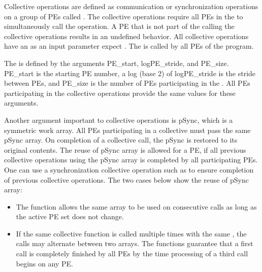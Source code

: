
Collective operations are defined as communication or synchronization operations 
on a group of \ac{PE}s called \activeset{}. The collective operations require all
\ac{PE}s in the \activeset{} to simultaneously call the operation. 
A \ac{PE} that is not part of the \activeset{} calling the collective 
operations results in an undefined behavior. All
collective operations have an \activeset{} as an input parameter expect %
\barrierall{}. The \barrierall{} is called by all \ac{PE}s of the \openshmem{}
program. 

The \activeset{} is defined by the arguments PE\_start, logPE\_stride, 
and PE\_size. PE\_start is the starting \ac{PE} number, a log (base 2) of logPE\_stride 
is the stride between \ac{PE}s, and PE\_size is the number of \ac{PE}s 
participating in the \activeset{}. All \ac{PE}s participating in the 
collective operations provide the same values for these arguments. 
 
Another argument important to collective operations is pSync, which is a symmetric work 
array. All \ac{PE}s participating in a collective must pass the same
pSync array. On completion of a collective call, the pSync is restored to its 
original contents. The reuse of pSync array is allowed for a \ac{PE}, if all previous collective 
operations using the pSync array is completed by all participating 
\ac{PE}s. One can use a synchronization collective operation such as \barrier{}
to ensure completion of previous collective operations. The two cases below
show the reuse of pSync array:

\begin{itemize}
\item The  function allows the same  array to be used
          on consecutive calls as long as the active \ac{PE} set does not change.
\item  If the same collective function is called multiple times with the
          same \activeset, the calls may alternate between two  arrays.
          The \openshmem functions guarantee that a first call is completely finished by 
          all \ac{PE}s by the time processing of a third  call  begins  on
          any \ac{PE}.          
\end{itemize}


